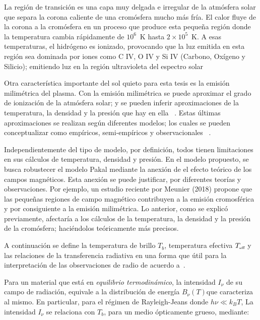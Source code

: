 La región de transición es una capa muy delgada e irregular de la atmósfera solar que separa la corona caliente de una cromósfera mucho más fría. El calor fluye de la corona a la cromósfera en un proceso que produce esta pequeña regi\'on donde la temperatura cambia rápidamente de $10^6$~K hasta $2\times 10^5$~K. A esas temperaturas, el hidrógeno es ionizado, provocando que la luz emitida en esta región sea dominada por iones como C IV, O IV y Si IV (Carbono, Oxígeno y Silicio); emitiendo luz en la región ultravioleta del espectro solar ~\citep{NASAtr}%

Otra caracter\'istica importante del sol quieto para esta tesis es la emisi\'on milim\'etrica del plasma. Con la emisi\'on milim\'etrica se puede aproximar el grado de ionizaci\'on de la atm\'osfera solar; y se pueden inferir aproximaciones de la temperatura, la densidad y la presi\'on que hay en ella ~\citep{millimeter}. Estas \'ultimas aproximaciones se realizan seg\'un diferentes modelos; los cuales se pueden conceptualizar como emp\'iricos, semi-emp\'iricos y observacionales ~\citep{2010ApJS..188..437D}.

Independientemente del tipo de modelo, por definici\'on, todos tienen limitaciones en sus c\'alculos de temperatura, densidad y presi\'on. En el modelo propuesto, se busca robustecer el modelo Pakal mediante la anexi\'on de el efecto te\'orico de los campos magn\'eticos. Esta anexi\'on se puede justificar, por diferentes teor\'ias y observaciones. Por ejemplo, un estudio reciente por Meunier (2018) propone que las peque\~nas regiones de campo magn\'etico contribuyen a la emisi\'on cromosf\'erica y por consiguiente a la emisi\'on milim\'etrica. Lo anterior, como se explic\'o previamente, afectar\'ia a los c\'alculos de la temperatura, la densidad y la presi\'on de la crom\'osfera; haci\'endolos te\'oricamente m\'as precisos.

A continuaci\'on se define la temperatura de brillo $T_{b}$, temperatura efectiva $T_{\mbox{\tiny eff}}$ y las relaciones de la transferencia radiativa en una forma que \'util para la interpretaci\'on de las observaciones de radio de acuerdo a~\citep{dulk_stars}.

Para un material que est\'a en \emph{equilibrio termodin\'amico}, la intensidad $I_{\nu}$ de su campo de radiaci\'on, equivale a la distribuci\'on de energ\'ia
$B_{\nu}(T)$que caracteriza al mismo. En particular, para el r\'egimen de Rayleigh-Jeans donde $h\nu \ll k_{B}T$, La intensidad $I_\nu$ se relaciona con $T_{b}$, para un medio \'opticamente grueso, mediante:


